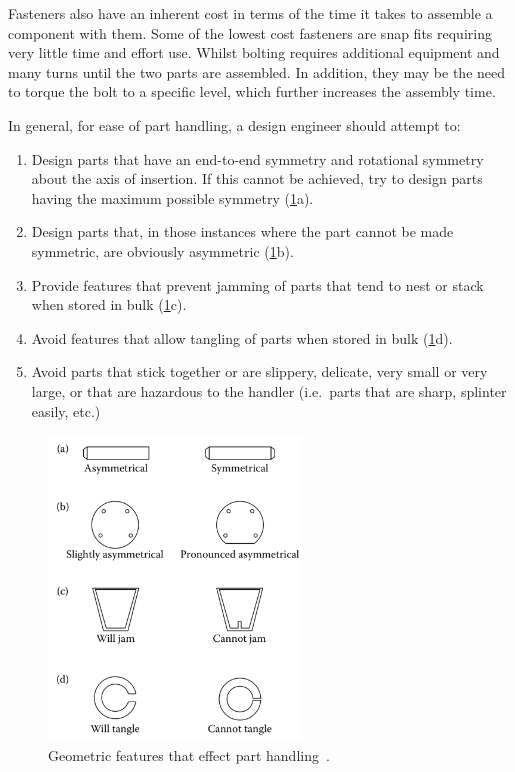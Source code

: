 Fasteners also have an inherent cost in terms of the time it takes to assemble a component with them. Some of the lowest cost fasteners are snap fits requiring very little time and effort use. Whilst bolting requires additional equipment and many turns until the two parts are assembled. In addition, they may be the need to torque the bolt to a specific level, which further increases the assembly time.

In general, for ease of part handling, a design engineer should attempt to:

\begin{enumerate}
  \item Design parts that have an end-to-end symmetry and rotational symmetry about the axis of insertion. If this cannot be achieved, try to design parts having the maximum possible symmetry (\cref{fig-handling}a).
  \item Design parts that, in those instances where the part cannot be made symmetric, are obviously asymmetric (\cref{fig-handling}b).
  \item Provide features that prevent jamming of parts that tend to nest or stack when stored in bulk (\cref{fig-handling}c).
  \item Avoid features that allow tangling of parts when stored in bulk (\cref{fig-handling}d).
  \item Avoid parts that stick together or are slippery, delicate, very small or very large, or that are hazardous to the handler (i.e.\ parts that are sharp, splinter easily, etc.)
\end{enumerate}

\begin{figure}[t!]
  \centering
  \includegraphics[width=0.6\textwidth]{figs/handling.png}
  \caption[Geometric features that effect part handling]{Geometric features that effect part handling~\citep{boothroyd2011}.}\label{fig-handling}
\end{figure}



